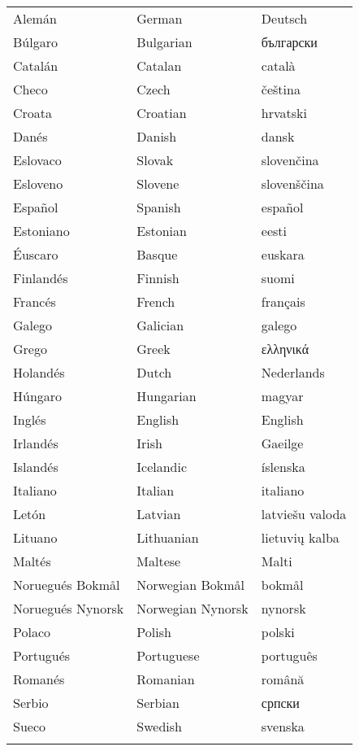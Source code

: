 \documentclass[10pt]{article}
\begin{document}
\centering
\begin{tabulary}{170mm}{LLL} \toprule
  Alemán & German & Deutsch\\
  Búlgaro & Bulgarian & български \\
  Catalán & Catalan & català\\
  Checo & Czech & čeština\\
  Croata & Croatian & hrvatski\\
  Danés & Danish & dansk\\
  Eslovaco & Slovak & slovenčina\\
  Esloveno & Slovene & slovenščina\\
  Español & Spanish & español\\
  Estoniano & Estonian & eesti\\
  Éuscaro & Basque & euskara\\
  Finlandés & Finnish & suomi\\
  Francés & French & français\\
  Galego & Galician & galego\\
  Grego & Greek & ελληνικά\\
  Holandés & Dutch & Nederlands\\
  Húngaro & Hungarian & magyar\\ 
  Inglés & English & English\\
  Irlandés & Irish & Gaeilge\\
  Islandés & Icelandic & íslenska\\
  Italiano & Italian & italiano\\
  Letón & Latvian & latviešu valoda\\
  Lituano & Lithuanian & lietuvių kalba\\
  Maltés & Maltese & Malti\\
  Noruegués Bokmål & Norwegian Bokmål & bokmål\\
  Noruegués Nynorsk & Norwegian Nynorsk & nynorsk\\
  Polaco & Polish & polski\\
  Portugués & Portuguese & português\\
  Romanés & Romanian & română\\
  Serbio & Serbian & српски\\
  Sueco & Swedish & svenska\\
     \addlinespace \bottomrule
\end{tabulary}
\end{document}
